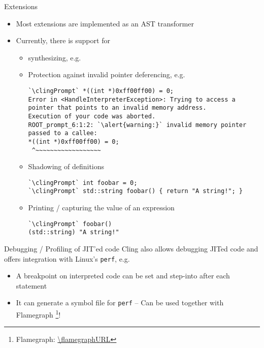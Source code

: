\begin{frame}[fragile]{Extensions}
  \begin{itemize}
    \itemsep=1ex

  \item Most extensions are implemented as an AST transformer
  \item Currently, there is support for
    \begin{itemize}
    \item {} synthesizing, e.g. 
      \pause

    \item Protection against invalid pointer deferencing, e.g.
      \begin{lstlisting}[style=c++]
`\clingPrompt` *((int *)0xff00ff00) = 0;
Error in <HandleInterpreterException>: Trying to access a pointer that points to an invalid memory address.
Execution of your code was aborted.
ROOT_prompt_6:1:2: `\alert{warning:}` invalid memory pointer passed to a callee:
*((int *)0xff00ff00) = 0;
 ^~~~~~~~~~~~~~~~~~~
      \end{lstlisting}
      \pause

    \item Shadowing of definitions
      \begin{lstlisting}[style=c++]
`\clingPrompt` int foobar = 0;
`\clingPrompt` std::string foobar() { return "A string!"; }
      \end{lstlisting}
      \pause

    \item Printing / capturing the value of an expression
      \begin{lstlisting}[style=c++]
`\clingPrompt` foobar()
(std::string) "A string!"
      \end{lstlisting}
    \end{itemize}
  \end{itemize}
\end{frame}

\begin{frame}[fragile]{Debugging / Profiling of JIT'ed code}
  Cling also allows debugging JITed code and offers integration with Linux's \texttt{perf}, e.g.
  \vfill

  \begin{itemize}
  \item A breakpoint on interpreted code can be set and step-into after each statement

  \item It can generate a symbol file for \texttt{perf} -- Can be used together with Flamegraph%
    \footnote{Flamegraph: \url{\flamegraphURL}}!
  \end{itemize}
\end{frame}

